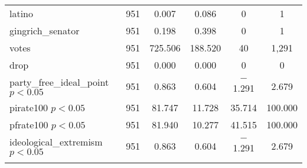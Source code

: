 \documentclass[12pt]{article}
\begin{document}
\begin{table}[!htbp]
\begin{tabular}{@{\extracolsep{5pt}}lccccc}
		latino & 951 & 0.007 & 0.086 & 0 & 1 \\ 
		gingrich\_senator & 951 & 0.198 & 0.398 & 0 & 1 \\ 
		votes & 951 & 725.506 & 188.520 & 40 & 1,291 \\ 
		drop & 951 & 0.000 & 0.000 & 0 & 0 \\ 
		\hline
		party\_free\_ideal\_point $ p < 0.05 $ & 951 & 0.863 & 0.604 & $-$1.291 & 2.679 \\ 
		pirate100 $ p < 0.05 $ & 951 & 81.747 & 11.728 & 35.714 & 100.000 \\ 
		pfrate100 $ p < 0.05 $ & 951 & 81.940 & 10.277 & 41.515 & 100.000 \\ 
		ideological\_extremism $ p < 0.05 $ & 951 & 0.863 & 0.604 & $-$1.291 & 2.679 \\ 
		\hline \\[-1.8ex] 
	\end{tabular} 
\end{table} 
\end{document}
